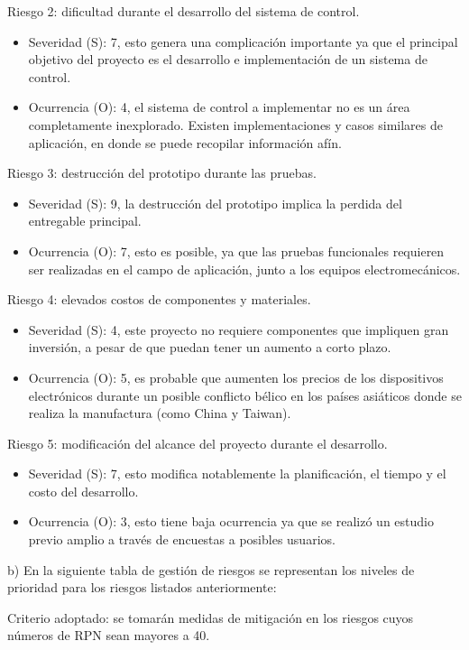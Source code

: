 \documentclass[
11pt, %
]{charter}
\begin{document}
Riesgo 2: dificultad durante el desarrollo del sistema de control.
\begin{itemize}
	\item Severidad (S): 7, esto genera una complicación importante ya que el principal objetivo del proyecto es el desarrollo e implementación de un sistema de control.
	\item Ocurrencia (O): 4, el sistema de control a implementar no es un área completamente inexplorado. Existen implementaciones y casos similares de aplicación, en donde se puede recopilar información afín.
\end{itemize}

Riesgo 3: destrucción del prototipo durante las pruebas.
\begin{itemize}
	\item Severidad (S): 9, la destrucción del prototipo implica la perdida del entregable principal.
	\item Ocurrencia (O): 7, esto es posible, ya que las pruebas funcionales requieren ser realizadas en el campo de aplicación, junto a los equipos electromecánicos.
\end{itemize}

Riesgo 4: elevados costos de componentes y materiales.
\begin{itemize}
	\item Severidad (S): 4, este proyecto no requiere componentes que impliquen gran inversión, a pesar de que puedan tener un aumento a corto plazo.
	\item Ocurrencia (O): 5, es probable que aumenten los precios de los dispositivos electrónicos durante un posible conflicto bélico en los países asiáticos donde se realiza la manufactura (como China y Taiwan).
\end{itemize}

Riesgo 5: modificación del alcance del proyecto durante el desarrollo.
\begin{itemize}
	\item Severidad (S): 7, esto modifica notablemente la planificación, el tiempo y el costo del desarrollo.
	\item Ocurrencia (O): 3, esto tiene baja ocurrencia ya que se realizó un estudio previo amplio a través de encuestas a posibles usuarios.
\end{itemize}

b) En la siguiente tabla de gestión de riesgos se representan los niveles de prioridad para los riesgos listados anteriormente:

Criterio adoptado: se tomarán medidas de mitigación en los riesgos cuyos números de RPN sean mayores a 40. 
\end{document}
